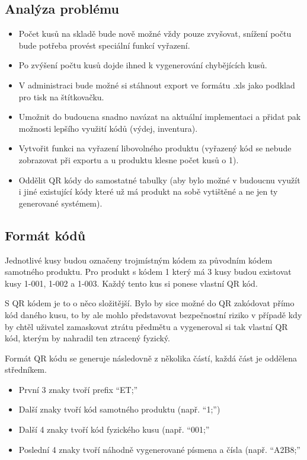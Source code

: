 \subsection{Analýza problému}

\begin{itemize}
    \item Počet kusů na skladě bude nově možné vždy pouze zvyšovat, snížení počtu bude potřeba provést speciální funkcí vyřazení.
    \item Po zvýšení počtu kusů dojde ihned k vygenerování chybějících kusů.
    \item V administraci bude možné si stáhnout export ve formátu .xls jako podklad pro tisk na štítkovačku.
    \item Umožnit do budoucna snadno navázat na aktuální implementaci a přidat pak možnosti lepšího využití kódů (výdej, inventura).
    \item Vytvořit funkci na vyřazení libovolného produktu (vyřazený kód se nebude zobrazovat při exportu a u produktu klesne počet kusů o 1).
    \item Oddělit QR kódy do samostatné tabulky (aby bylo možné v budoucnu využít i jiné existující kódy které už má produkt na sobě vytištěné a ne jen ty generované systémem).
\end{itemize}

\subsection{Formát kódů}

Jednotlivé kusy budou označeny trojmístným kódem za původním kódem samotného produktu. Pro produkt s kódem 1 který má 3 kusy budou existovat kusy 1-001, 1-002 a 1-003. Každý tento kus si ponese vlastní QR kód.

S QR kódem je to o něco složitější. Bylo by sice možné do QR zakódovat přímo kód daného kusu, to by ale mohlo představovat bezpečnostní riziko v případě kdy by chtěl uživatel zamaskovat ztrátu předmětu a vygeneroval si tak vlastní QR kód, kterým by nahradil ten ztracený fyzický. 

Formát QR kódu se generuje následovně z několika částí, každá část je oddělena středníkem.

\begin{itemize}
    \item První 3 znaky tvoří prefix \enquote{ET;}
    \item Další znaky tvoří kód samotného produktu (např.  \enquote{1;}) 
    \item Další 4 znaky tvoří kód fyzického kusu (např. \enquote{001;}
    \item Poslední 4 znaky tvoří náhodně vygenerované písmena a čísla (např. \enquote{A2B8;}
\end{itemize}

